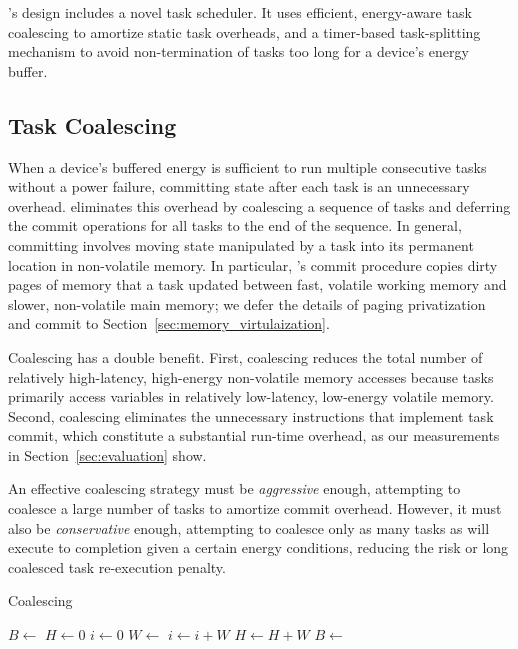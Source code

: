 \sys's design includes a novel task scheduler. It uses efficient, energy-aware task coalescing to amortize static task overheads, and a timer-based task-splitting mechanism to avoid non-termination of tasks too long for a device's energy buffer. 

\subsection{Task Coalescing}
\label{sec:task_coalescing}

When a device's buffered energy is sufficient to run multiple consecutive tasks without a power failure, committing state after each task is an unnecessary overhead. \sys eliminates this overhead by coalescing a sequence of tasks and deferring the commit
operations for all tasks to the end of the sequence. In general, committing involves moving state manipulated by a task into its permanent location in non-volatile memory. In particular, \sys's commit procedure copies dirty pages of memory that a task updated between fast, volatile working memory and slower, non-volatile main memory; we defer the details of paging privatization and commit to Section~\ref{sec:memory_virtulaization}.

Coalescing has a double benefit. First, coalescing reduces the total number of relatively high-latency, high-energy non-volatile memory accesses because tasks primarily access variables in relatively low-latency, low-energy volatile memory. Second, coalescing eliminates the unnecessary instructions that implement task commit, which constitute a substantial run-time overhead, as our measurements in Section~\ref{sec:evaluation} show.

An effective coalescing strategy must be {\em aggressive} enough, attempting to coalesce a large number of tasks to amortize commit overhead. However, it must also be  {\em conservative} enough, attempting to coalesce only as many tasks as will execute to completion given a certain energy conditions, reducing the risk or long coalesced task re-execution penalty. 

\begin{algorithm}[t]
	\caption{Coalescing}
	\label{algo:genCoalescing}
	\scriptsize
	\begin{algorithmic}[1]
        \State $B \leftarrow $ 
        \State $H \gets 0$ 
	        \State $ i \gets 0$
		        \State {}
		        \State $W \leftarrow $ 
		        \State $i \gets i + W$
				\State $H \gets H + W$
	        \EndWhile
	        \State {}
	        \State $B \leftarrow $ 
        \EndWhile
	\end{algorithmic}
\end{algorithm}


